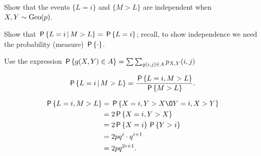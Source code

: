 \documentclass[a4paper,12pt]{article}
\begin{document}
\begin{exercise}\label{ex:10}
Show that the events $\{L=i\}$ and $\{M>L\}$ are independent when $X,Y \sim \Geo{p}$.
\begin{hint}
Show that $\P{L=i \given M>L} = \P{L=i}$; recall, to show independence we need the probability (measure) $\P{\cdot}$.

Use the expression $\P{g(X,Y)\in A} = \mathop{\sum\sum}_{g(i, j) \in A} p_{X,Y}(i,j)$
\end{hint}
\begin{solution}
\begin{align}
    \label{eq:1}
\P{L=i\given M > L} 
=\frac{\P{L=i, M > L}}{\P{M>L}}.
\end{align}

\begin{align}
\P{L=i,  M > L} 
&= \P{X=i, Y > X \O Y=i, X > Y } \\
&= 2\P{X=i,Y > X} \\
&= 2\P{X=i}\P{Y > i} \\
&= 2pq^i\cdot q^{i+1}\\
&= 2p q^{2i+1}.
\end{align}


\end{solution}
\end{exercise}
\end{document}
